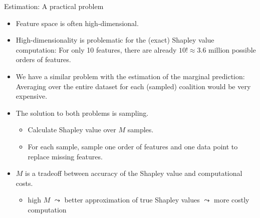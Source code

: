 \documentclass[aspectratio=169]{../latex_main/tntbeamer}  %
\begin{document}
\begin{frame}{Estimation: A practical problem}
  \begin{itemize}
      \item Feature space is often high-dimensional.
      \item High-dimensionality is problematic for the (exact) Shapley value computation: For only 10 features, there are already $10! \approx 3.6$ million possible orders of features.
      \item We have a similar problem with the estimation of the marginal prediction: Averaging over the entire dataset for each (sampled) coalition would be very expensive.
      \item The solution to both problems is sampling. 
      \begin{itemize}
          \item Calculate Shapley value over $M$ samples. 
          \item For each sample, sample one order of features and one data point to replace missing features.
      \end{itemize}
      \item $M$ is a tradeoff between accuracy of the Shapley value and computational costs. 
      \begin{itemize}
          \item high $M$ $\leadsto$ better approximation of true Shapley values $\leadsto$ more costly computation
      \end{itemize}
  \end{itemize}
\end{frame}

\newcommand{\xk}{\mathbf{x}^{(k)}}
\end{document}
